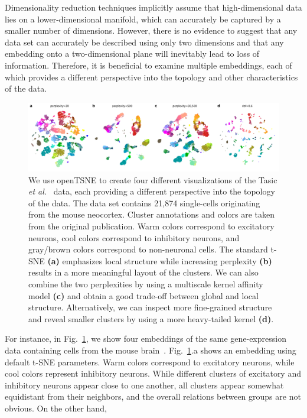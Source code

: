 \documentclass[twocolumn]{bmcart}
\begin{document}
Dimensionality reduction techniques implicitly assume that high-dimensional
data lies on a lower-dimensional manifold, which can accurately be captured by
a smaller number of dimensions. However, there is no evidence to suggest that
any data set can accurately be described using only two dimensions and that any
embedding onto a two-dimensional plane will inevitably lead to loss of
information. Therefore, it is beneficial to examine multiple embeddings, each
of which provides a different perspective into the topology and other
characteristics of the data.
\begin{figure}[htbp]
	\includegraphics[width=\textwidth]{tasic2018}
	\caption{\label{fig:tasic}We use openTSNE to create four different
    visualizations of the Tasic \textit{et al.}~\cite{tasic2018shared} data,
    each providing a different perspective into the topology of the data.
    The data set contains 21,874 single-cells originating from the mouse
	neocortex. Cluster annotations and colors are taken from the original
	publication. Warm colors correspond to excitatory neurons, cool colors
	correspond to inhibitory neurons, and gray/brown colors correspond to
	non-neuronal cells. The standard t-SNE \textbf{(a)} emphasizes local
	structure while increasing perplexity \textbf{(b)} results in a more
	meaningful layout of the clusters. We can also combine the two
	perplexities by using a multiscale kernel affinity model \textbf{(c)}
	and obtain a good trade-off between global and local structure.
	Alternatively, we can inspect more fine-grained structure and reveal
	smaller clusters by using a more heavy-tailed kernel \textbf{(d)}.}
\end{figure}
For instance, in Fig.~\ref{fig:tasic}, we show four embeddings of
the same gene-expression data containing cells from the mouse brain~\cite{tasic2018shared}.
Fig.~\ref{fig:tasic}.a shows an embedding using default t-SNE parameters.
Warm colors correspond to excitatory neurons, while
cool colors represent inhibitory neurons. While different clusters of
excitatory and inhibitory neurons appear close to one another, all clusters
appear somewhat equidistant from their neighbors, and the overall
relations between groups are not obvious. On the other hand,
\end{document}
